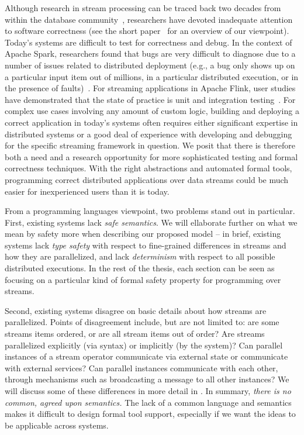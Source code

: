 Although research in stream processing can be traced back two decades from within the database community~\cite{Aurora,Borealis,STREAM2004,ABW2006CQL},
researchers have devoted inadequate attention to software correctness (see the short paper~ for an overview of our viewpoint).
Today's systems are difficult to test for correctness and debug. In the context of Apache Spark, researchers found that bugs are very difficult to diagnose due to a number of issues related to distributed deployment (e.g., a bug only shows up on a particular input item out of millions, in a particular distributed execution, or in the presence of faults)~\cite{gulzar2016bigdebug}. For streaming applications in Apache Flink, user studies have demonstrated that the state of practice is unit and integration testing~\cite{vianna2019exploratory}.
For complex use cases involving any amount of custom logic, building and deploying a correct application in today's systems often requires either significant expertise in distributed systems or a good deal of experience with developing and debugging for the specific streaming framework in question. We posit that there is therefore both a need and a research opportunity for more sophisticated testing and formal correctness techniques. With the right abstractions and automated formal tools, programming correct distributed applications over data streams could be much easier for inexperienced users than it is today.

From a programming languages viewpoint, two problems stand out in particular. First, existing systems lack \emph{safe semantics}. We will ellaborate further on what we mean by safety more when describing our proposed model -- in brief, existing systems lack \emph{type safety} with respect to fine-grained differences in streams and how they are parallelized, and lack \emph{determinism} with respect to all possible distributed executions. In the rest of the thesis, each section can be seen as focusing on a particular kind of formal safety property for programming over streams.

Second, existing systems disagree on basic details about how streams are parallelized. Points of disagreement include, but are not limited to: are some streams items ordered, or are all stream items out of order? Are streams parallelized explicitly (via syntax) or implicitly (by the system)? Can parallel instances of a stream operator communicate via external state or communicate with external services? Can parallel instances communicate with each other, through mechanisms such as broadcasting a message to all other instances? We will discuss some of these differences in more detail in . In summary, \emph{there is no common, agreed upon semantics.} The lack of a common language and semantics makes it difficult to design formal tool support, especially if we want the ideas to be applicable across systems.

